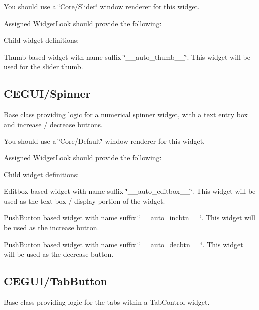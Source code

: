 You should use a \char`\"{}\+Core/\+Slider\char`\"{} window renderer for this widget.

Assigned Widget\+Look should provide the following\+: 
\begin{DoxyItemize}
\item Child widget definitions\+: 
\begin{DoxyItemize}
\item Thumb based widget with name suffix \char`\"{}\+\_\+\+\_\+auto\+\_\+thumb\+\_\+\+\_\+\char`\"{}. This widget will be used for the slider thumb. 
\end{DoxyItemize}
\end{DoxyItemize}\hypertarget{fal_baseclass_ref_fal_baseclass_ref_sec_24}{}\subsection{C\+E\+G\+U\+I/\+Spinner}\label{fal_baseclass_ref_fal_baseclass_ref_sec_24}
Base class providing logic for a numerical spinner widget, with a text entry box and increase / decrease buttons.

You should use a \char`\"{}\+Core/\+Default\char`\"{} window renderer for this widget.

Assigned Widget\+Look should provide the following\+: 
\begin{DoxyItemize}
\item Child widget definitions\+: 
\begin{DoxyItemize}
\item Editbox based widget with name suffix \char`\"{}\+\_\+\+\_\+auto\+\_\+editbox\+\_\+\+\_\+\char`\"{}. This widget will be used as the text box / display portion of the widget. 
\item Push\+Button based widget with name suffix \char`\"{}\+\_\+\+\_\+auto\+\_\+incbtn\+\_\+\+\_\+\char`\"{}. This widget will be used as the increase button. 
\item Push\+Button based widget with name suffix \char`\"{}\+\_\+\+\_\+auto\+\_\+decbtn\+\_\+\+\_\+\char`\"{}. This widget will be used as the decrease button. 
\end{DoxyItemize}
\end{DoxyItemize}\hypertarget{fal_baseclass_ref_fal_baseclass_ref_sec_25}{}\subsection{C\+E\+G\+U\+I/\+Tab\+Button}\label{fal_baseclass_ref_fal_baseclass_ref_sec_25}
Base class providing logic for the tabs within a Tab\+Control widget.

